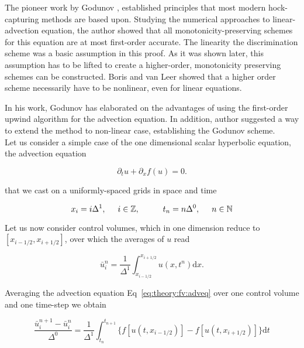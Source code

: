 The pioneer work by Godunov \citep{Godunov:1959}, established principles that most modern hock-capturing methods are based upon. Studying the numerical approaches to linear-advection equation, the author showed that all monotonicity-preserving schemes for this equation are at most first-order accurate. The linearity the discrimination scheme was a basic assumption in this proof. As it was shown later, this assumption has to be lifted to create a higher-order, monotonicity preserving schemes can be constructed. Boris \citep{Boris:1971} and van Leer \citep{vanLeer:1973} showed that a higher order scheme necessarily have to be nonlinear, even for linear equations. 

In his work, Godunov has elaborated on the advantages of using the first-order upwind algorithm for the advection equation. In addition, author suggested a way to extend the method to non-linear case, establishing the Godunov scheme. \\

Let us consider a simple case of the one dimensional scalar hyperbolic equation, the advection equation

\begin{equation}
\partial_t u + \partial_x f(u) = 0.
\label{eq:theory:fv:adveq}
\end{equation}

that we cast on a uniformly-spaced grids in space and time 

\begin{equation}
x_i = i\Delta^1, \hspace{5mm} i\in\mathbb{Z}, \hspace{10mm} t_n = n\Delta^0, \hspace{5mm} n\in\mathbb{N}
\end{equation}

Let us now consider control volumes, which in one dimension reduce to $[x_{i-1/2},x_{i+1/2}]$, over which the averages of $u$ read

\begin{equation}
\bar{u}_i ^n = \frac{1}{\Delta^1}\int_{x_{i-1/2}}^{x_{i + 1/2}} u(x, t^n) \text{d}x.
\end{equation}

Averaging the advection equation Eq~\eqref{eq:theory:fv:adveq} over one control volume and one time-step we obtain

\begin{equation}
    \frac{\bar{u}_{i}^{n+1}-\bar{u}_{i}^{n}}{\Delta^0} = \frac{1}{\Delta^1}\int_{t_n}^{t_{n+1}}\big\{f[u(t,x_{i-1/2})] - f[u(t,x_{i+1/2})]\big\}\text{d}t
    \label{eq:theory:fv:intadveq}
\end{equation}

